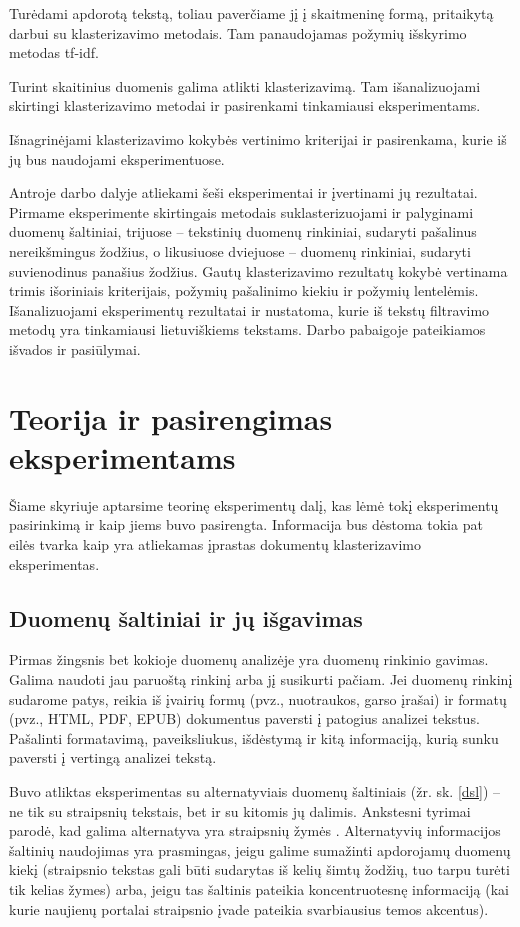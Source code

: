 \documentclass{VUMIFInfBakalaurinis}
\begin{document}
Turėdami apdorotą tekstą, toliau paverčiame jį į skaitmeninę formą,
  pritaikytą darbui su klasterizavimo metodais. Tam panaudojamas požymių
  išskyrimo metodas tf-idf.

Turint skaitinius duomenis galima atlikti klasterizavimą. Tam
  išanalizuojami skirtingi klasterizavimo metodai ir pasirenkami
  tinkamiausi eksperimentams.

Išnagrinėjami klasterizavimo kokybės vertinimo kriterijai ir
  pasirenkama, kurie iš jų bus naudojami eksperimentuose.


Antroje darbo dalyje atliekami šeši eksperimentai ir įvertinami jų
rezultatai. Pirmame eksperimente skirtingais metodais suklasterizuojami
ir palyginami duomenų šaltiniai, trijuose -- tekstinių duomenų
rinkiniai, sudaryti pašalinus nereikšmingus žodžius, o likusiuose
dviejuose -- duomenų rinkiniai, sudaryti suvienodinus panašius žodžius.
Gautų klasterizavimo rezultatų kokybė vertinama trimis išoriniais
kriterijais, požymių pašalinimo kiekiu ir požymių lentelėmis.
Išanalizuojami eksperimentų rezultatai ir nustatoma, kurie iš tekstų
filtravimo metodų yra tinkamiausi lietuviškiems tekstams. Darbo pabaigoje pateikiamos išvados ir pasiūlymai.

\section{Teorija ir pasirengimas eksperimentams}

Šiame skyriuje aptarsime teorinę eksperimentų dalį, kas lėmė tokį
eksperimentų pasirinkimą ir kaip jiems buvo pasirengta.
Informacija bus dėstoma tokia pat eilės tvarka kaip yra atliekamas
įprastas dokumentų klasterizavimo eksperimentas.

\subsection{Duomenų šaltiniai ir jų išgavimas}

Pirmas žingsnis bet kokioje duomenų analizėje yra duomenų rinkinio
gavimas. Galima naudoti jau paruoštą rinkinį arba jį susikurti pačiam.
Jei duomenų rinkinį sudarome patys, reikia iš įvairių formų (pvz.,
nuotraukos, garso įrašai) ir formatų (pvz., HTML, PDF, EPUB) dokumentus
paversti į patogius analizei tekstus. Pašalinti formatavimą,
paveiksliukus, išdėstymą ir kitą informaciją, kurią sunku paversti į
vertingą analizei tekstą.

Buvo atliktas eksperimentas su alternatyviais duomenų
šaltiniais (žr. sk. \ref{dsl}) -- ne tik su straipsnių
tekstais, bet ir su kitomis jų dalimis. Ankstesni tyrimai parodė, kad
galima alternatyva yra straipsnių žymės \cite{vzalinauskas2006individualiai}.
Alternatyvių informacijos šaltinių naudojimas yra prasmingas, jeigu
galime sumažinti apdorojamų duomenų kiekį (straipsnio tekstas gali būti
sudarytas iš kelių šimtų žodžių, tuo tarpu turėti tik kelias žymes)
arba, jeigu tas šaltinis pateikia koncentruotesnę informaciją (kai kurie
naujienų portalai straipsnio įvade pateikia svarbiausius temos
akcentus).
\end{document}
